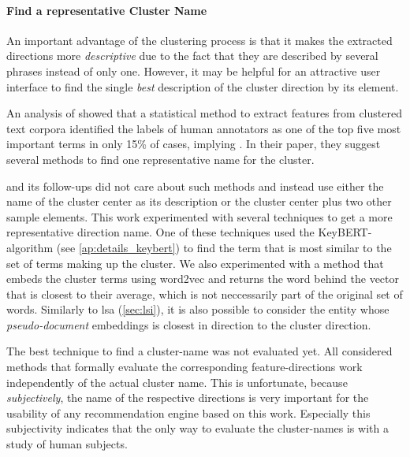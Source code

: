 \paragraph{Find a representative Cluster Name}

An important advantage of the clustering process is that it makes the extracted directions more \textit{descriptive} due to the fact that they are described by several phrases instead of only one. However, it may be helpful for an attractive user interface to find the single \textit{best} description of the cluster direction by its element.

An analysis of \cite{Carmel2009} showed that a statistical method to extract features from clustered text corpora identified the labels of human annotators as one of the top five most important terms in only 15\% of cases, implying  \cite[139]{Carmel2009}. In their paper, they suggest several methods to find one representative name for the cluster. 

\textcite{Derrac2015} and its follow-ups \cite{Ager2018,Alshaikh2020} did not care about such methods and instead use either the name of the cluster center as its description or the cluster center plus two other sample elements. This work experimented with several techniques to get a more representative direction name. One of these techniques used the KeyBERT-algorithm (see \autoref{ap:details_keybert}) to find the term that is most similar to the set of terms making up the cluster. We also experimented with a method that embeds the cluster terms using \gls{word2vec} and returns  the word behind the vector that is closest to their average, which is not neccessarily part of the original set of words. Similarly to \gls{lsa} (\autoref{sec:lsi}), it is also possible to consider the entity whose \textit{pseudo-document} embeddings is closest in direction to the cluster direction.

The best technique to find a cluster-name was not evaluated yet. All considered methods that formally evaluate the corresponding feature-directions work independently of the actual cluster name. This is unfortunate, because \textit{subjectively}, the name of the respective directions is very important for the usability of any recommendation engine based on this work. Especially this subjectivity indicates that the only way to evaluate the cluster-names is with a study of human subjects.


